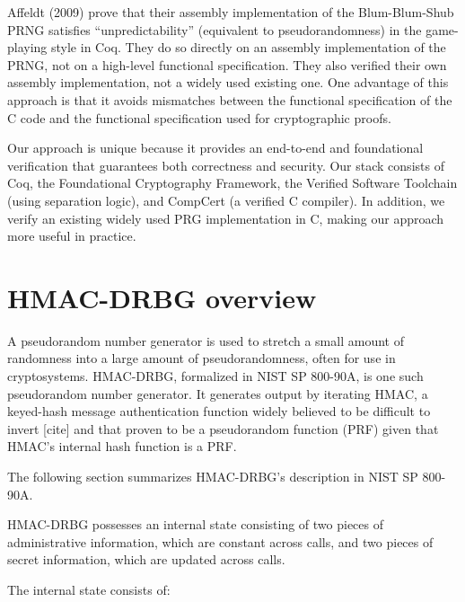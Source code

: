\documentclass[12pt,lot, lof]{puthesis}
\begin{document}
Affeldt (2009) prove that their assembly implementation of the Blum-Blum-Shub PRNG satisfies ``unpredictability'' (equivalent to pseudorandomness) in the game-playing style in Coq. They do so directly on an assembly implementation of the PRNG, not on a high-level functional specification. They also verified their own assembly implementation, not a widely used existing one. One advantage of this approach is that it avoids mismatches between the functional specification of the C code and the functional specification used for cryptographic proofs.

Our approach is unique because it provides an end-to-end and foundational verification that guarantees both correctness and security. Our stack consists of Coq, the Foundational Cryptography Framework, the Verified Software Toolchain (using separation logic), and CompCert (a verified C compiler). In addition, we verify an existing widely used PRG implementation in C, making our approach more useful in practice. 


\section{HMAC-DRBG overview}
A pseudorandom number generator is used to stretch a small amount of randomness into a large amount of pseudorandomness, often for use in cryptosystems. HMAC-DRBG, formalized in NIST SP 800-90A, is one such pseudorandom number generator. It generates output by iterating HMAC, a keyed-hash message authentication function widely believed to be difficult to invert [cite] and that proven to be a pseudorandom function (PRF) given that HMAC's internal hash function is a PRF. %

The following section summarizes HMAC-DRBG's description in NIST SP 800-90A.

HMAC-DRBG possesses an internal state consisting of two pieces of administrative information, which are constant across calls, and two pieces of secret information, which are updated across calls.

The internal state consists of:
\end{document}

